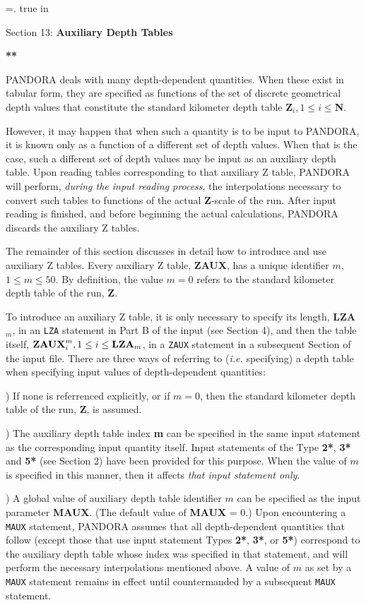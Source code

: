 %
\newtoks\footline \footline={\hss{}.\folio\hss}
\top
{} true in
\centerline{Section 13: {\bf Auxiliary Depth Tables}}
\blankline
\blankline
\centerline{\bf ***}
\blankline
\blankline
PANDORA deals with many depth-dependent quantities. When these exist in
tabular form, they are specified as functions of the set of discrete 
geometrical depth values that constitute the standard kilometer depth
table {\bf Z}$_i, 1 \leq i \leq ${\bf N}.

However, it may happen that when such a quantity is to be input to
PANDORA, it is known only as a function of a different set of depth values.
When that is the case, such a different set of depth values may be input
as an auxiliary depth table. Upon reading tables corresponding to
that auxiliary Z table, PANDORA will perform, {\it during the input
reading process}, the interpolations necessary to convert such tables
to functions of the actual {\bf Z}-scale of the run. After input reading
is finished, and before beginning the actual calculations, PANDORA
discards the auxiliary Z tables.

The remainder of this section discusses in detail how to introduce and
use auxiliary Z tables.
\blankline
Every auxiliary Z table, {\bf ZAUX}, has a unique identifier $m$,
$1 \leq  m \leq 50$. \break By definition, the value $m = 0$ refers
to the standard kilometer depth table of the run, {\bf Z}.

To introduce an auxiliary Z table, it is only necessary to specify its
length, {\bf LZA}$_m$, in an {\tt LZA} statement in Part B of the
input (see Section 4), and then the table itself, ${\bf ZAUX}^m_i, 1 \leq i
\leq {\bf LZA}_m$, in a {\tt ZAUX} statement in a subsequent Section
of the input file.
\ej
There are three ways of referring to ({\it i.e.} specifying) a depth
table when specifying input values of depth-dependent quantities:

) If none is referrenced explicitly, or if $m = 0$, then
the standard kilometer depth table of the run, {\bf Z}, is assumed.

) The auxiliary depth table index {\bf m} can be specified in the
same input statement as the corresponding input quantity itself. Input
statements of the \break Type {\bf 2*}, {\bf 3*} and {\bf 5*} (see
Section 2) have been provided for this purpose. When the value of $m$ is
specified in this manner, then it affects {\it that input statement only}.

) A global value of auxiliary depth table identifier $m$ can be
specified as the input parameter {\bf MAUX}. (The default value of
{\bf MAUX} = 0.) Upon encountering a {\tt MAUX} statement, PANDORA assumes
that all depth-dependent quantities that follow (except those that use input
statement Types {\bf 2*}, {\bf 3*}, or {\bf 5*}) correspond to the auxiliary
depth table whose index was specified in that statement, and will perform
the necessary interpolations mentioned above. A value of $m$ as set by
a {\tt MAUX} statement remains in effect until countermanded by a subsequent
{\tt MAUX} statement. 

